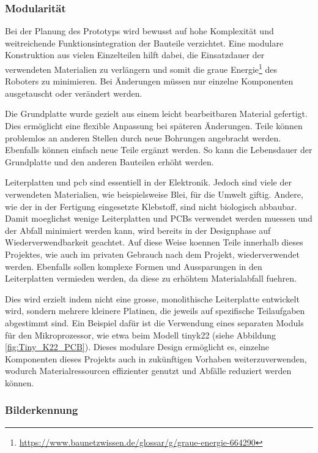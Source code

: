\subsubsection{Modularität}\label{nachhaltigkeit:mod}

Bei der Planung des Prototyps wird bewusst auf hohe Komplexität und weitreichende Funktionsintegration der Bauteile verzichtet. Eine modulare Konstruktion aus vielen Einzelteilen hilft dabei, die Einsatzdauer der verwendeten Materialien zu verlängern und somit die graue Energie\footnote{\url{https://www.baunetzwissen.de/glossar/g/graue-energie-664290}} des Roboters zu minimieren. Bei Änderungen müssen nur einzelne Komponenten ausgetauscht oder verändert werden.

Die Grundplatte wurde gezielt aus einem leicht bearbeitbaren Material gefertigt. Dies ermöglicht eine flexible Anpassung bei späteren Änderungen. Teile können problemlos an anderen Stellen durch neue Bohrungen angebracht werden. Ebenfalls können einfach neue Teile ergänzt werden. So kann die Lebensdauer der Grundplatte und den anderen Bauteilen erhöht werden.

Leiterplatten und \acrfull{pcb} sind essentiell in der Elektronik. Jedoch sind viele der verwendeten Materialien, wie beispielsweise Blei, für die Umwelt giftig. Andere, wie der in der Fertigung eingesetzte Klebstoff, sind nicht biologisch abbaubar. Damit moeglichst wenige Leiterplatten und PCBs verwendet werden muessen und der Abfall minimiert werden kann, wird bereits in der Designphase auf Wiederverwendbarkeit geachtet. Auf diese Weise koennen Teile innerhalb dieses Projektes, wie auch im privaten Gebrauch nach dem Projekt, wiederverwendet werden. Ebenfalls sollen komplexe Formen und Aussparungen in den Leiterplatten vermieden werden, da diese zu erhöhtem Materialabfall fuehren.

Dies wird erzielt indem nicht eine grosse, monolithische Leiterplatte entwickelt wird, sondern mehrere kleinere Platinen, die jeweils auf spezifische Teilaufgaben abgestimmt sind. Ein Beispiel dafür ist die Verwendung eines separaten Moduls für den Mikroprozessor, wie etwa beim Modell \gls{tinyk22} (siehe Abbildung \ref{fig:Tiny_K22_PCB}). Dieses modulare Design ermöglicht es, einzelne Komponenten dieses Projekts auch in zukünftigen Vorhaben weiterzuverwenden, wodurch Materialressourcen effizienter genutzt und Abfälle reduziert werden können.


\subsubsection{Bilderkennung}\label{nachhaltigkeit:bilderkennung}

